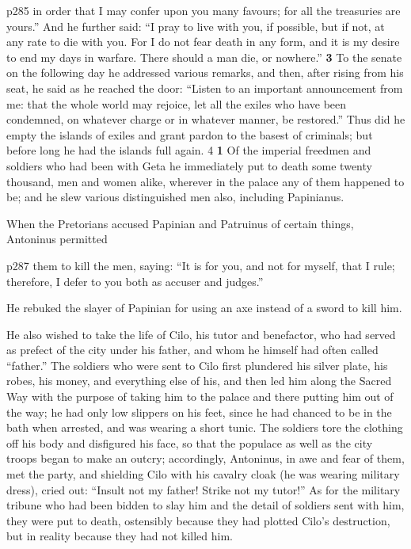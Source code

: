p285 in order that I may confer upon you many favours; for all the treasuries are yours.'' And he further said: ``I pray to live with you, if possible, but if not, at any rate to die with you. For I do not fear death in any form, and it is my desire to end my days in warfare. There should a man die, or nowhere.'' \textbf{3} To the senate on the following day he addressed various remarks, and then, after rising from his seat, he said as he reached the door: ``Listen to an important announcement from me: that the whole world may rejoice, let all the exiles who have been condemned, on whatever charge or in whatever manner, be restored.'' Thus did he empty the islands of exiles and grant pardon to the basest of criminals; but before long he had the islands full again. 4 \textbf{1} Of the imperial freedmen and soldiers who had been with Geta he immediately put to death some twenty thousand, men and women alike, wherever in the palace any of them happened to be; and he slew various distinguished men also, including Papinianus.

When the Pretorians accused Papinian and Patruinus of certain things, Antoninus permitted

p287 them to kill the men, saying: ``It is for you, and not for myself, that I rule; therefore, I defer to you both as accuser and judges.''

He rebuked the slayer of Papinian for using an axe instead of a sword to kill him.

He also wished to take the life of Cilo, his tutor and benefactor, who had served as prefect of the city under his father, and whom he himself had often called ``father.'' The soldiers who were sent to Cilo first plundered his silver plate, his robes, his money, and everything else of his, and then led him along the Sacred Way with the purpose of taking him to the palace and there putting him out of the way; he had only low slippers on his feet, since he had chanced to be in the bath when arrested, and was wearing a short tunic. The soldiers tore the clothing off his body and disfigured his face, so that the populace as well as the city troops began to make an outcry; accordingly, Antoninus, in awe and fear of them, met the party, and shielding Cilo with his cavalry cloak (he was wearing military dress), cried out: ``Insult not my father! Strike not my tutor!'' As for the military tribune who had been bidden to slay him and the detail of soldiers sent with him, they were put to death, ostensibly because they had plotted Cilo's destruction, but in reality because they had not killed him.

